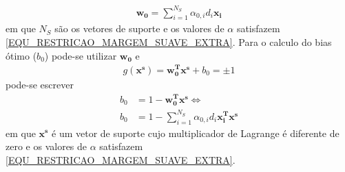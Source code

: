 \begin{align}
\mathbf{w_{0}} = \sum\limits_{i=1}^{N_{S}} \alpha_{0,i}d_{i}\mathbf{x_{i}} \label{EQU_SVM_W_OTIMO_MARGEM_SUAVE}
\end{align}
em que \(N_{S}\) são os vetores de suporte e os valores de \(\alpha\) satisfazem \eqref{EQU_RESTRICAO_MARGEM_SUAVE_EXTRA}. Para o calculo do bias ótimo (\(b_{0}\)) pode-se utilizar \(\mathbf{w_{0}}\) e 
\begin{align}
g(\mathbf{x^{s}}) = \mathbf{w_{0}^{T}}\mathbf{x^{s}} + b_{0} = \pm 1
\end{align}
pode-se escrever
\begin{align}
b_{0} &= 1 - \mathbf{w_{0}^{T}}\mathbf{x^{s}} \Leftrightarrow \\
b_{0} &= 1 - \sum\limits_{i=1}^{N_{S}} \alpha_{0,i}d_{i}\mathbf{x_{i}^{T}}\mathbf{x^{s}} 
\end{align}
em que \(\mathbf{x^{s}}\) é um vetor de suporte cujo multiplicador de Lagrange é diferente de zero e os valores de \(\alpha\) satisfazem \eqref{EQU_RESTRICAO_MARGEM_SUAVE_EXTRA}.

